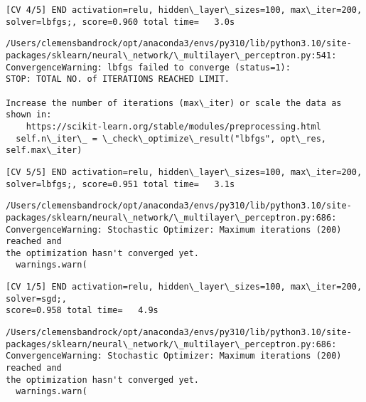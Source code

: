 \documentclass[11pt]{article}
\begin{document}
    \begin{Verbatim}[commandchars=\\\{\}]
[CV 4/5] END activation=relu, hidden\_layer\_sizes=100, max\_iter=200,
solver=lbfgs;, score=0.960 total time=   3.0s
    \end{Verbatim}

    \begin{Verbatim}[commandchars=\\\{\}]
/Users/clemensbandrock/opt/anaconda3/envs/py310/lib/python3.10/site-
packages/sklearn/neural\_network/\_multilayer\_perceptron.py:541:
ConvergenceWarning: lbfgs failed to converge (status=1):
STOP: TOTAL NO. of ITERATIONS REACHED LIMIT.

Increase the number of iterations (max\_iter) or scale the data as shown in:
    https://scikit-learn.org/stable/modules/preprocessing.html
  self.n\_iter\_ = \_check\_optimize\_result("lbfgs", opt\_res, self.max\_iter)
    \end{Verbatim}

    \begin{Verbatim}[commandchars=\\\{\}]
[CV 5/5] END activation=relu, hidden\_layer\_sizes=100, max\_iter=200,
solver=lbfgs;, score=0.951 total time=   3.1s
    \end{Verbatim}

    \begin{Verbatim}[commandchars=\\\{\}]
/Users/clemensbandrock/opt/anaconda3/envs/py310/lib/python3.10/site-
packages/sklearn/neural\_network/\_multilayer\_perceptron.py:686:
ConvergenceWarning: Stochastic Optimizer: Maximum iterations (200) reached and
the optimization hasn't converged yet.
  warnings.warn(
    \end{Verbatim}

    \begin{Verbatim}[commandchars=\\\{\}]
[CV 1/5] END activation=relu, hidden\_layer\_sizes=100, max\_iter=200, solver=sgd;,
score=0.958 total time=   4.9s
    \end{Verbatim}

    \begin{Verbatim}[commandchars=\\\{\}]
/Users/clemensbandrock/opt/anaconda3/envs/py310/lib/python3.10/site-
packages/sklearn/neural\_network/\_multilayer\_perceptron.py:686:
ConvergenceWarning: Stochastic Optimizer: Maximum iterations (200) reached and
the optimization hasn't converged yet.
  warnings.warn(
    \end{Verbatim}
\end{document}
